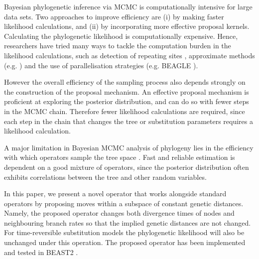 \documentclass{bmcart}
\begin{document}
Bayesian phylogenetic inference via MCMC is computationally intensive for large data sets.
Two approaches to improve efficiency are (i) by making faster likelihood calculations, and (ii) by incorporating more effective proposal kernels. Calculating the phylogenetic likelihood is computationally expensive.
Hence, researchers have tried many ways to tackle the computation burden in the likelihood calculations, such as detection of repeating sites \cite{kobert2017efficient},  approximate methods (e.g. \cite{guindon2010bayesian,reis2011approximate}) and the use of parallelisation strategies (e.g. BEAGLE \cite{ayres2011beagle}).

However the overall efficiency of the sampling process also depends strongly on the construction of the proposal mechanism. An effective proposal mechanism is proficient at exploring the posterior distribution, and can do so with fewer steps in the MCMC chain. Therefore fewer likelihood calculations are required, since each step in the chain that changes the tree or substitution parameters requires a likelihood calculation.

A major limitation in Bayesian MCMC analysis of phylogeny lies in the efficiency with which operators sample the tree space \cite{lakner2008efficiency,hohna2012guided}. Fast and reliable estimation is dependent on a good mixture of operators, since the posterior distribution often exhibits correlations between the tree and other random variables.

In this paper, we present a novel operator that works alongside standard operators by proposing moves within a subspace of constant genetic distances.
Namely, the proposed operator changes both divergence times of nodes and neighbouring branch rates so that the implied genetic distances are not changed. For time-reversible substitution models the phylogenetic likelihood will also be unchanged under this operation. The proposed operator has been implemented and tested in BEAST2 \cite{bouckaert2014beast}.
\end{document}
